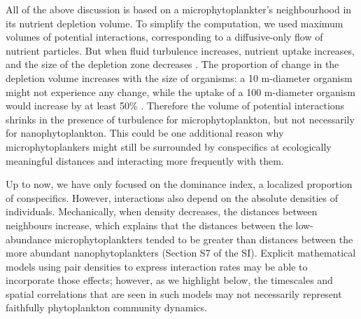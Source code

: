 \documentclass[12pt,english]{article}
\begin{document}
All of the above discussion is based on a microphytoplankter's neighbourhood
in its nutrient depletion volume. To simplify the computation, we
used maximum volumes of potential interactions, corresponding to a
diffusive-only flow of nutrient particles. But when fluid turbulence
increases, nutrient uptake increases, and the size of the depletion
zone decreases \citep{karp-boss_nutrient_1996}. The proportion of
change in the depletion volume increases with the size of organisms:
a 10 \textmu m-diameter organism might not experience any change,
while the uptake of a 100 \textmu m-diameter organism would increase
by at least 50\% \citep{karp-boss_nutrient_1996}. Therefore the volume
of potential interactions shrinks in the presence of turbulence for
microphytoplankton, but not necessarily for nanophytoplankton. This
could be one additional reason why microphytoplankers might still
be surrounded by conspecifics at ecologically meaningful distances
and interacting more frequently with them.

Up to now, we have only focused on the dominance index, a localized
proportion of conspecifics. However, interactions also depend on the
absolute densities of individuals. Mechanically, when density decreases,
the distances between neighbours increase, which explains that the
distances between the low-abundance microphytoplankters tended to
be greater than distances between the more abundant nanophytoplankters
(Section S7 of the SI). Explicit mathematical models using pair densities
to express interaction rates \citep[e.g.][]{law_population_2003,plank_spatial_2015}
may be able to incorporate those effects; however, as we highlight
below, the timescales and spatial correlations that are seen in such
models may not necessarily represent faithfully phytoplankton community
dynamics.
\end{document}
